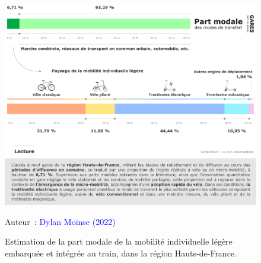 \begin{refsegment}
    \begin{figure}[h!]\vspace*{4pt}
        \caption{Estimation de la part modale de la mobilité individuelle légère embarquée et intégrée au train, dans la région Hauts-de-France.}
        \label{fig-chap4:part-modale-detaillee-mobilite-individuelle-legere}
        \centerline{\includegraphics[width=1\columnwidth]{src/Figures/Chap-4/FR_Observation_quantitative_part_modale.pdf}}
        \vspace{5pt}
        \begin{flushright}\scriptsize{
        Auteur~: \textcolor{blue}{Dylan Moinse (2022)}
        }\end{flushright}
    \end{figure}


\end{refsegment}

